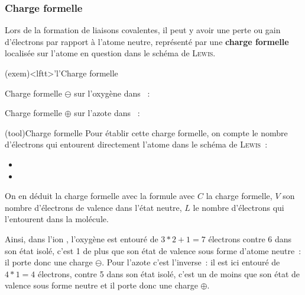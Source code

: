 \documentclass[../../main/main.tex]{subfiles}
\begin{document}
\subsubsection{Charge formelle}
Lors de la formation de liaisons covalentes, il peut y avoir une perte ou gain
d'électrons par rapport à l'atome neutre, représenté par une \textbf{charge
	formelle} localisée sur l'atome en question dans le schéma de \textsc{Lewis}.

\begin{tcb*}(exem)<lftt>'l'{Charge formelle}
	\begin{minipage}[t]{0.48\linewidth}
		Charge formelle $\ominus$ sur l'oxygène dans ~:
		\vspace{1cm}
	\end{minipage}
	\hfill
	\begin{minipage}[t]{0.48\linewidth}
		Charge formelle $\oplus$ sur l'azote dans ~:
		\vspace{-15pt}
	\end{minipage}
\end{tcb*}

\begin{tcb*}(tool){Charge formelle}
	Pour établir cette charge formelle, on compte le nombre d'électrons qui
	entourent directement l'atome dans le schéma de \textsc{Lewis}~:
	\begin{itemize}
		\item {}
		\item {}
	\end{itemize}
	On en déduit la charge formelle avec la formule
	\psw{
		\[\boxed{C = V - L}\]
	}
	avec $C$ la charge formelle, $V$ son nombre d'électrons de valence dans l'état
	neutre, $L$ le nombre d'électrons qui l'entourent dans la molécule.
\end{tcb*}

Ainsi, dans l'ion , l'oxygène est entouré de $3*2+1=7$ électrons contre
6 dans son état isolé, c'est 1 de plus que son état de valence sous forme
d'atome neutre~: il porte donc une charge $\ominus$. Pour l'azote c'est
l'inverse~: il est ici entouré de $4*1=4$ électrons, contre 5 dans son état
isolé, c'est un de moins que son état de valence sous forme neutre et il porte
donc une charge $\oplus$.
\end{document}

